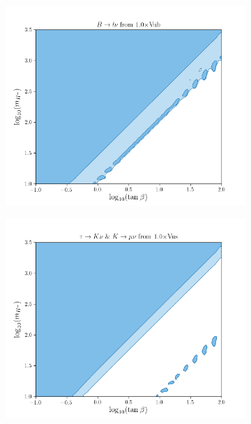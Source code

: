 \documentclass[11pt]{article}
\begin{document}
\begin{figure}[H]\ContinuedFloat
    \centering
    \begin{subfigure}[b]{0.45\textwidth}
        \includegraphics[width=\textwidth]{vub/Blnu1.0.png}
    \end{subfigure}
    \begin{subfigure}[b]{0.45\textwidth}
        \includegraphics[width=\textwidth]{vus/Klnu1.0.png}
    \end{subfigure}
    \begin{subfigure}[b]{0.45\textwidth}

\end{subfigure}
\end{figure}
\end{document}
